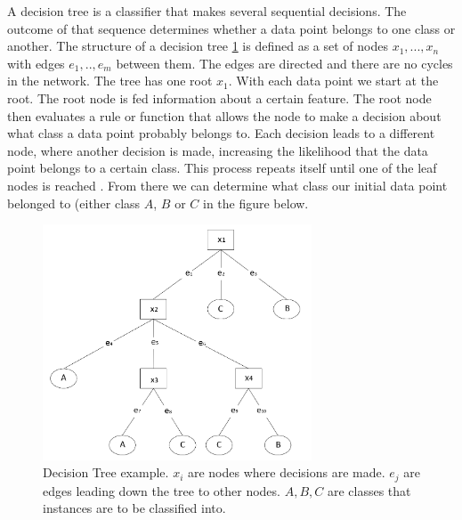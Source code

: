 A decision tree is a classifier that makes several sequential decisions. The outcome of that sequence determines whether a data point belongs to one class or another. The structure of a decision tree \ref{fig:DT} is defined as a set of nodes ${x_1, ... , x_n}$ with edges ${e_1, .., e_{m}}$ between them. The edges are directed and there are no cycles in the network. The tree has one root $x_1$. With each data point we start at the root. The root node is fed information about a certain feature. The root node then evaluates a rule or function that allows the node to make a decision about what class a data point probably belongs to. Each decision leads to a different node, where another decision is made, increasing the likelihood that the data point belongs to a certain class. This process repeats itself until one of the leaf nodes is reached \cite{safavian1991survey}. From there we can determine what class our initial data point belonged to (either class $A$, $B$ or $C$ in the figure below. 

\begin{figure}[H]
    \includegraphics[width=80mm]{./img/decisiontree.png}
    \caption{\footnotesize{Decision Tree example. $x_i$ are nodes where decisions are made. $e_j$ are edges leading down the tree to other nodes. $A,B,C$ are classes that instances are to be classified into.}}
    \label{fig:DT}
\end{figure}

